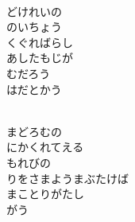 \documentclass[10pt,b5j]{tarticle} %
\begin{document}
\vspace{1.5em} %
\newcommand{\linespace}{0.5em} %
\newcommand{\blocksize}{0.5\hsize} %
\newcommand{\itemmargin}{3em} %
\begin{enumerate} %
    \setlength{\itemindent}{\itemmargin} %
    \begin{minipage}[c]{\blocksize}
    
        \vspace{\linespace}
        \item~\\
        どけれいの\\
        のいちょう\\
        くぐればらし\\
        あしたもじが\\
        むだろう\\
        はだとかう
        
    \end{minipage}
    \begin{minipage}[c]{\blocksize}
        
        \vspace{\linespace}
        \item~\\
        まどろむの\\
        にかくれてえる\\
        もれびの\\
        りをさまようまぶたけば\\
        まことりがたし\\
        がう
        
    \end{minipage}
    \begin{minipage}[c]{\blocksize}
        

\end{minipage}
\end{enumerate}
\end{document}
